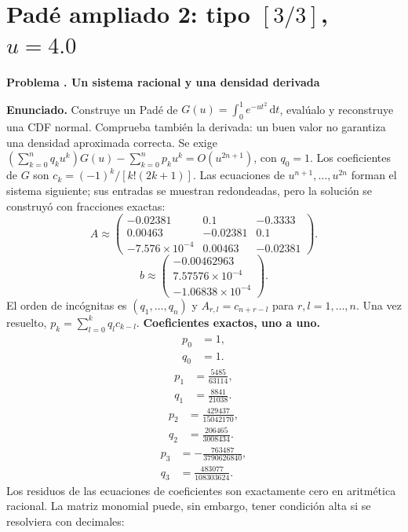 \documentclass[11pt,a4paper]{article}
\newcommand{\dd}{\,\mathrm d}
\theoremstyle{definition}
\newcounter{problema}
\newenvironment{resuelto}[1]{\refstepcounter{problema}\par\medskip\Needspace{6\baselineskip}\textbf{Problema \theproblema. #1}\par}{\par\medskip}
\begin{document}
\section{\texorpdfstring{Padé ampliado 2: tipo $[3/3]$, $u=4.0$}{Padé ampliado 2: tipo [3/3], u=4.0}}
\begin{resuelto}{Un sistema racional y una densidad derivada}
\textbf{Enunciado.} Construye un Padé de $G(u)=\int_0^1e^{-ut^2}\dd t$, evalúalo y reconstruye una CDF normal. Comprueba también la derivada: un buen valor no garantiza una densidad aproximada correcta.
Se exige $(\sum_{k=0}^{n}q_ku^k)G(u)-\sum_{k=0}^{n}p_ku^k=O(u^{2n+1})$, con $q_0=1$. Los coeficientes de $G$ son $c_k=(-1)^k/[k!(2k+1)]$.
Las ecuaciones de $u^{n+1},\ldots,u^{2n}$ forman el sistema siguiente; sus entradas se muestran redondeadas, pero la solución se construyó con fracciones exactas:
{\small
\[
A\approx\begin{pmatrix}-0.02381&0.1&-0.3333\\0.00463&-0.02381&0.1\\-7.576\times10^{-4}&0.00463&-0.02381\end{pmatrix}.
\]
\[
b\approx\begin{pmatrix}-0.00462963\\7.57576\times10^{-4}\\-1.06838\times10^{-4}\end{pmatrix}.
\]
}
El orden de incógnitas es $(q_1,\ldots,q_n)$ y $A_{r,l}=c_{n+r-l}$ para $r,l=1,\ldots,n$. Una vez resuelto, $p_k=\sum_{l=0}^{k}q_lc_{k-l}$.
\textbf{Coeficientes exactos, uno a uno.}
\[
\begin{aligned}p_0&=1,\\q_0&=1.\end{aligned}
\]
\[
\begin{aligned}p_1&=\frac{5485}{63114},\\q_1&=\frac{8841}{21038}.\end{aligned}
\]
\[
\begin{aligned}p_2&=\frac{429437}{15042170},\\q_2&=\frac{206465}{3008434}.\end{aligned}
\]
\[
\begin{aligned}p_3&=-\frac{763487}{3790626840},\\q_3&=\frac{483077}{108303624}.\end{aligned}
\]
Los residuos de las ecuaciones de coeficientes son exactamente cero en aritmética racional. La matriz monomial puede, sin embargo, tener condición alta si se resolviera con decimales:
\[
\]
\end{resuelto}
\end{document}
